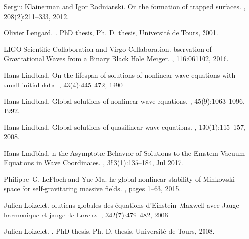 \documentclass[reqno,11pt,letterpaper]{amsart}
\numberwithin{equation}{section}
\numberwithin{figure}{section}
\theoremstyle{definition}
\theoremstyle{remark}
\begin{document}
\begin{thebibliography}{GCHMG05}
Sergiu Klainerman and Igor Rodnianski.
\newblock On the formation of trapped surfaces.
, 208(2):211--333, 2012.

Olivier Lengard.
.
\newblock PhD thesis, Ph. D. thesis, Universit{\'e} de Tours, 2001.

{LIGO Scientific Collaboration and Virgo Collaboration}.
bservation of {G}ravitational {W}aves from a {B}inary {B}lack
  {H}ole {M}erger.
, 116:061102, 2016.

Hans Lindblad.
\newblock On the lifespan of solutions of nonlinear wave equations with small
  initial data.
, 43(4):445--472,
  1990.

Hans Lindblad.
\newblock Global solutions of nonlinear wave equations.
,
  45(9):1063--1096, 1992.

Hans Lindblad.
\newblock Global solutions of quasilinear wave equations.
, 130(1):115--157, 2008.

Hans Lindblad.
n the {A}symptotic {B}ehavior of {S}olutions to the {E}instein
  {V}acuum {E}quations in {W}ave {C}oordinates.
, 353(1):135--184, Jul
  2017.

Philippe~G. LeFloch and Yue Ma.
he global nonlinear stability of {M}inkowski space for
  self-gravitating massive fields.
, pages 1--63, 2015.

Julien Loizelet.
olutions globales des {\'e}quations d'{E}instein--{M}axwell avec
  {J}auge harmonique et jauge de {L}orenz.
, 342(7):479--482, 2006.

Julien Loizelet.
.
\newblock PhD thesis, Ph. D. thesis, Universit{\'e} de Tours, 2008.


\end{thebibliography}
\end{document}
